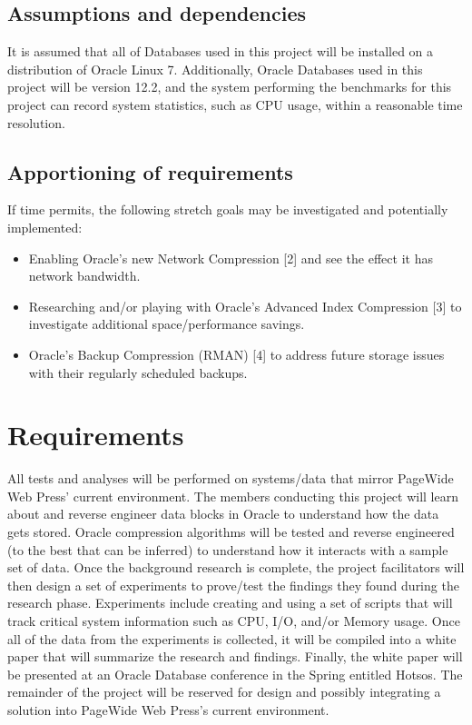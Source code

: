 \documentclass[10pt]{article}
\begin{document}
\subsection{Assumptions and dependencies}
It is assumed that all of Databases used in this project will be installed on a distribution of Oracle Linux 7. Additionally, Oracle Databases used in this project will be version 12.2, and the system performing the benchmarks for this project can record system statistics, such as CPU usage, within a reasonable time resolution.

\subsection{Apportioning of requirements}

If time permits, the following stretch goals may be investigated and potentially implemented:
\begin{itemize}
	\item Enabling Oracle's new Network Compression [2] and see the effect it has network bandwidth.
	\item Researching and/or playing with Oracle's Advanced Index Compression [3] to investigate additional space/performance savings.
	\item Oracle's Backup Compression (RMAN) [4] to address future storage issues with their regularly scheduled backups.
\end{itemize}

\section{Requirements}

All tests and analyses will be performed on systems/data that mirror PageWide Web Press' current environment. The members conducting this project will learn about and reverse engineer data blocks in Oracle to understand how the data gets stored. Oracle compression algorithms will be tested and reverse engineered (to the best that can be inferred) to understand how it interacts with a sample set of data. Once the background research is complete, the project facilitators will then design a set of experiments to prove/test the findings they found during the research phase. Experiments include creating and using a set of scripts that will track critical system information such as CPU, I/O, and/or Memory usage. Once all of the data from the experiments is collected, it will be compiled into a white paper that will summarize the research and findings. Finally, the white paper will be presented at an Oracle Database conference in the Spring entitled Hotsos. The remainder of the project will be reserved for design and possibly integrating a solution into PageWide Web Press's current environment.
\end{document}
